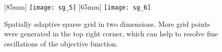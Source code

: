 \begin{figure}
  [85mm]{%
    \texttt{[image: sg\_5]}%
  }%
  \hfill%
  [65mm]{%
    \texttt{[image: sg\_6]}%
  }%
  \caption{%
    Spatially adaptive sparse grid in two dimensions.
    More grid points were generated in the top right corner,
    which can help to resolve fine oscillations of the objective function.%
  }
  \label{fig:spatiallyAdaptiveSG}
\end{figure}
